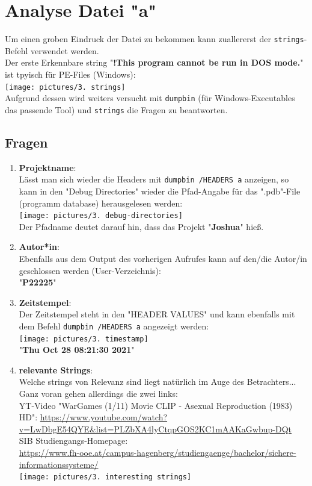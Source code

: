 \documentclass{article}
\begin{document}
	\pagebreak
	
	\section*{Analyse Datei "a"}
	Um einen groben Eindruck der Datei zu bekommen kann zuallererst der \texttt{strings}-Befehl verwendet werden.\\
	Der erste Erkennbare string "\textbf{!This program cannot be run in DOS mode.}" ist tpyisch für PE-Files (Windows):\\
	\texttt{[image: pictures/3. strings]}\\
	Aufgrund dessen wird weiters versucht mit \texttt{dumpbin} (für Windows-Executables das passende Tool) und \texttt{strings} die Fragen zu beantworten.\\
	
	\subsection*{Fragen}
	\begin{enumerate}
		\item \textbf{Projektname}:\\
		Lässt man sich wieder die Headers mit \texttt{dumpbin /HEADERS a} anzeigen, so kann in den "Debug Directories" wieder die Pfad-Angabe für das ".pdb"-File (programm database) herausgelesen werden:\\
		\texttt{[image: pictures/3. debug-directories]}\\
		Der Pfadname deutet darauf hin, dass das Projekt "\textbf{Joshua}" hieß.\\
		\item \textbf{Autor*in}:\\
		Ebenfalls aus dem Output des vorherigen Aufrufes kann auf den/die Autor/in geschlossen werden (User-Verzeichnis):\\
		"\textbf{P22225}"
		\item \textbf{Zeitstempel}:\\
		Der Zeitstempel steht in den "HEADER VALUES" und kann ebenfalls mit dem Befehl \texttt{dumpbin /HEADERS a} angezeigt werden:\\
		\texttt{[image: pictures/3. timestamp]}\\
		"\textbf{Thu Oct 28 08:21:30 2021}"
		
		\pagebreak
		
		\item \textbf{relevante Strings}:\\
		Welche strings von Relevanz sind liegt natürlich im Auge des Betrachters...\\
		Ganz voran gehen allerdings die zwei links:\\
		YT-Video "WarGames (1/11) Movie CLIP - Asexual Reproduction (1983) HD":
		\url{https://www.youtube.com/watch?v=LwDbgE54QYE&list=PLZbXA4lyCtqpGOS2KC1mAAKaGwbup-DQt}\\
		SIB Studiengangs-Homepage:\\
		\url{https://www.fh-ooe.at/campus-hagenberg/studiengaenge/bachelor/sichere-informationssysteme/}\\
		\texttt{[image: pictures/3. interesting strings]}
	\end{enumerate}
	
	\label{LastPage}
	
\end{document}
